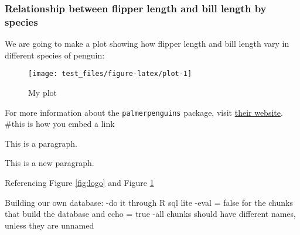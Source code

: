 \documentclass[
]{book}
\begin{document}
\hypertarget{relationship-between-flipper-length-and-bill-length-by-species}{%
\subsubsection{Relationship between flipper length and bill length by species}\label{relationship-between-flipper-length-and-bill-length-by-species}}

We are going to make a plot showing how flipper length and bill length vary in
different species of penguin:

\begin{figure}

{\centering \texttt{[image: test\_files/figure-latex/plot-1]} 

}

\caption{My plot}\label{fig:plot}
\end{figure}

For more information about the \texttt{palmerpenguins} package, visit \href{https://allisonhorst.github.io/palmerpenguins/}{their website}.
\#this is how you embed a link

This is a paragraph.

This is a new paragraph.

Referencing Figure \ref{fig:logo} and Figure \ref{fig:plot}

Building our own database:
-do it through R sql lite
-eval = false for the chunks that build the database and echo = true
-all chunks should have different names, unless they are unnamed

  
\end{document}

